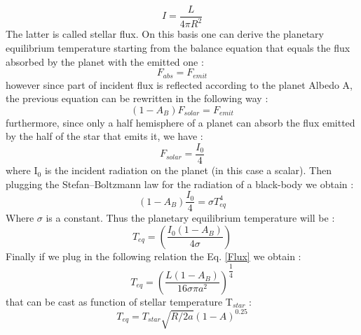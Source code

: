 \documentclass[
12pt, %
a4paper, %
oneside, %
headinclude,footinclude, %
BCOR5mm, %
]{scrartcl}
\begin{document}
\begin{equation}
 I =\dfrac{L}{4\pi R^{2}}
\label{Flux}
\end{equation}
The latter is called stellar flux. On this basis one can derive the planetary equilibrium temperature starting from the balance equation that equals the flux absorbed by the planet with the emitted one \cite{catling2017atmospheric}: 
\begin{equation}
F_{abs}=F_{emit}
\end{equation}
however since part of incident flux is reflected according to the planet Albedo A, the previous equation can be rewritten in the following way \cite{catling2017atmospheric}:
\begin{equation}
(1-A_{B})F_{solar}=F_{emit}
\end{equation}
furthermore, since only a half hemisphere of a planet can absorb the flux emitted by the half of the star that emits it, we have \cite{catling2017atmospheric}:
\begin{equation}
F_{solar}=\dfrac{I_{0}}{4}
\end{equation}
where I$_{0}$ is the incident radiation on the planet (in this case a scalar). Then plugging the Stefan–Boltzmann law for the radiation of a black-body we obtain \cite{catling2017atmospheric}: 
\begin{equation}
\left(1-A_{B}\right)\dfrac{I_{0}}{4}=\sigma T^{4}_{eq}
\end{equation}
Where $\sigma$ is a constant. Thus the planetary equilibrium temperature will be \cite{catling2017atmospheric}:
\begin{equation}
T_{eq}=\left(\dfrac{I_{0}\left(1-A_{B}\right)}{4\sigma}\right)
\end{equation}
Finally if we plug in the following relation the Eq. \ref{Flux} we obtain \cite{catling2017atmospheric}:
\begin{equation}
T_{eq}=\left(\dfrac{L\left(1-A_{B}\right)}{16\sigma\pi a^{2}}\right)^{\dfrac{1}{4}}
\end{equation}
that can be cast as function of stellar temperature  T$_{star}$ \cite{catling2017atmospheric}:
\begin{equation}
T_{eq}=T_{star}\sqrt{R/2a}\left(1-A\right)^{0.25}
\end{equation}
\end{document}
